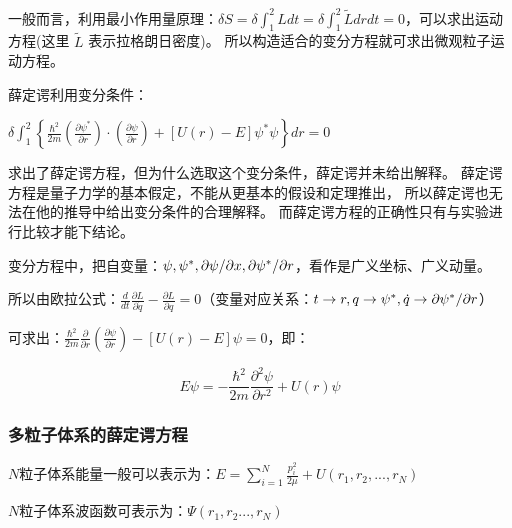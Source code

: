 一般而言，利用最小作用量原理：$\delta S = \delta \int_1^2 {Ldt}  = \delta \int_1^2 {\tilde Ldrdt}  = 0$，可以求出运动方程(这里 $\tilde L$ 表示拉格朗日密度)。
所以构造适合的变分方程就可求出微观粒子运动方程。


薛定谔利用变分条件：

\begin{center}
$\delta \int_1^2 {\left\{ {\frac{{\hbar ^2 }}{{2m}}\left( {\frac{{\partial \psi ^* }}{{\partial r}}} \right) \cdot \left( {\frac{{\partial \psi }}{{\partial r}}} \right) + \left[ {U(r) - E} \right]\psi ^* \psi } \right\}dr}  = 0$
\end{center}

求出了薛定谔方程，但为什么选取这个变分条件，薛定谔并未给出解释。
薛定谔方程是量子力学的基本假定，不能从更基本的假设和定理推出，
所以薛定谔也无法在他的推导中给出变分条件的合理解释。
而薛定谔方程的正确性只有与实验进行比较才能下结论。

变分方程中，把自变量：$\psi ,\psi ^* ,{{\partial \psi } \mathord{\left/
 {\vphantom {{\partial \psi } {\partial x}}} \right.
 \kern-\nulldelimiterspace} {\partial x}},{{\partial \psi ^* } \mathord{\left/
 {\vphantom {{\partial \psi ^* } {\partial r}}} \right.
 \kern-\nulldelimiterspace} {\partial r}}$，看作是广义坐标、广义动量。

所以由欧拉公式：$\frac{d}{{dt}}\frac{{\partial L}}{{\partial \dot q}} - \frac{{\partial L}}{{\partial q}} = 0$（变量对应关系：$t \to r,q \to \psi ^* ,\dot q \to {{\partial \psi ^* } \mathord{\left/
 {\vphantom {{\partial \psi ^* } {\partial r}}} \right.
 \kern-\nulldelimiterspace} {\partial r}}$）

可求出：$\frac{{\hbar ^2 }}{{2m}}\frac{\partial }{{\partial r}}\left( {\frac{{\partial \psi }}{{\partial r}}} \right) - \left[ {U(r) - E} \right]\psi  = 0$，即：

\begin{equation}
E\psi  =  - \frac{{\hbar ^2 }}{{2m}}\frac{{\partial ^2 \psi }}{{\partial r^2 }} + U(r)\psi 
\end{equation}

\subsubsection{多粒子体系的薛定谔方程}

$N$粒子体系能量一般可以表示为：$E = \sum\limits_{i = 1}^N {\frac{{p_i ^2 }}{{2\mu }}}  + U(r_1 ,r_2 ,...,r_N )$

$N$粒子体系波函数可表示为：$\Psi (r_1 ,r_2 ...,r_N )$

